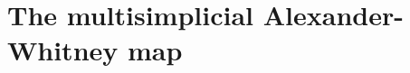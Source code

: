 \documentclass[a4paper,11pt]{article}
\theoremstyle{remark}
\theoremstyle{definition}
\begin{document}






\section{The multisimplicial Alexander-Whitney map}
\end{document}

